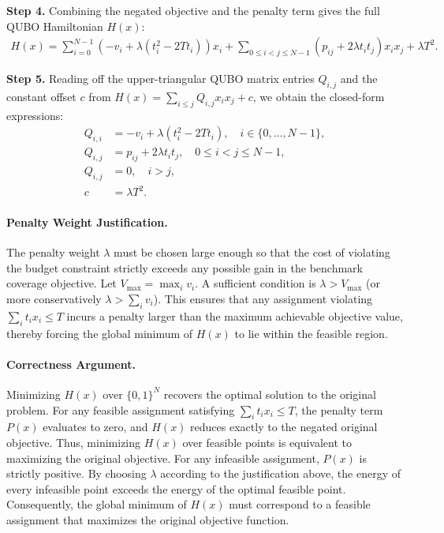 \documentclass[12pt]{article}
\begin{document}
\textbf{Step 4.} Combining the negated objective and the penalty term gives the full QUBO Hamiltonian $H(x)$:
\begin{align}
    H(x) = \sum_{i=0}^{N-1} \left( -v_i + \lambda(t_i^2 - 2T t_i) \right) x_i + \sum_{0 \leq i < j \leq N-1} \left( p_{ij} + 2\lambda t_i t_j \right) x_i x_j + \lambda T^2.
\end{align}

\textbf{Step 5.} Reading off the upper-triangular QUBO matrix entries $Q_{i,j}$ and the constant offset $c$ from $H(x) = \sum_{i \leq j} Q_{i,j} x_i x_j + c$, we obtain the closed-form expressions:
\begin{align}
    Q_{i,i} &= -v_i + \lambda(t_i^2 - 2T t_i), \quad i \in \{0, \dots, N-1\}, \\
    Q_{i,j} &= p_{ij} + 2\lambda t_i t_j, \quad 0 \leq i < j \leq N-1, \\
    Q_{i,j} &= 0, \quad i > j, \\
    c &= \lambda T^2.
\end{align}

\paragraph{Penalty Weight Justification.}
The penalty weight $\lambda$ must be chosen large enough so that the cost of violating the budget constraint strictly exceeds any possible gain in the benchmark coverage objective. Let $V_{\max} = \max_i v_i$. A sufficient condition is $\lambda > V_{\max}$ (or more conservatively $\lambda > \sum_i v_i$). This ensures that any assignment violating $\sum_i t_i x_i \leq T$ incurs a penalty larger than the maximum achievable objective value, thereby forcing the global minimum of $H(x)$ to lie within the feasible region.

\paragraph{Correctness Argument.}
Minimizing $H(x)$ over $\{0,1\}^N$ recovers the optimal solution to the original problem. For any feasible assignment satisfying $\sum_i t_i x_i \leq T$, the penalty term $P(x)$ evaluates to zero, and $H(x)$ reduces exactly to the negated original objective. Thus, minimizing $H(x)$ over feasible points is equivalent to maximizing the original objective. For any infeasible assignment, $P(x)$ is strictly positive. By choosing $\lambda$ according to the justification above, the energy of every infeasible point exceeds the energy of the optimal feasible point. Consequently, the global minimum of $H(x)$ must correspond to a feasible assignment that maximizes the original objective function.
\end{document}
